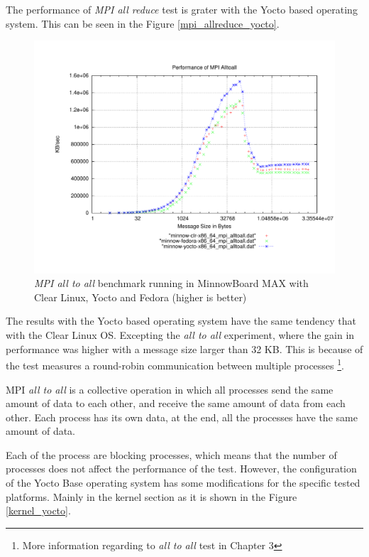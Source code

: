 The performance of \textit{MPI all reduce} test is grater with the Yocto based
operating system. This can be seen in the Figure \ref{mpi_allreduce_yocto}.

\begin{figure}
  \includegraphics[width=\paperwidth]{images/mpbench_yocto_experiments/mpi_alltoall.pdf}
\caption{\textit{MPI all to all} benchmark running in  MinnowBoard MAX with Clear Linux, Yocto
and Fedora (higher is better)}
\label{mpi_all_to_all_yocto}
\end{figure}

The results with the Yocto based operating system have the same
tendency that with the Clear Linux OS. Excepting  the \textit{all to all}
experiment, where the gain in performance was higher with a message size
larger than 32 KB. This is because of the test measures a round-robin communication 
between multiple processes \footnote{More information regarding to \textit{all
to all} test in Chapter 3}.

MPI \textit{all to all} is a collective operation in which all processes send
the same amount of data to each other, and receive the same amount of data from
each other. Each process has its own data, at the end, all the processes have
the same amount of data. 

Each of the process are blocking processes, which means that the number of
processes does not affect the performance of the test. However,
the configuration of the Yocto Base operating system has 
some modifications for the specific tested platforms. Mainly in the
kernel section as it is shown in the Figure \ref{kernel_yocto}.

